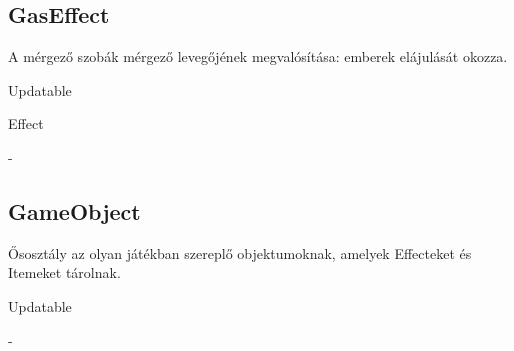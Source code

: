 \subsection{GasEffect}
\begin{class-template-responsibility}
    A mérgező szobák mérgező levegőjének megvalósítása: emberek elájulását okozza.
\end{class-template-responsibility}
\begin{class-template-interface}
    Updatable
\end{class-template-interface}
\begin{class-template-baseclass}
    Effect
\end{class-template-baseclass}
\begin{class-template-attribute}
    -
\end{class-template-attribute}
\begin{class-template-method}
\end{class-template-method}

\subsection{GameObject}
\begin{class-template-responsibility}
    Ősosztály az olyan játékban szereplő objektumoknak, amelyek Effecteket és Itemeket tárolnak. 
\end{class-template-responsibility}
\begin{class-template-interface}
    Updatable
\end{class-template-interface}
\begin{class-template-baseclass} -  
\end{class-template-baseclass}
\begin{class-template-attribute}
\end{class-template-attribute}
\begin{class-template-method}
\end{class-template-method}

